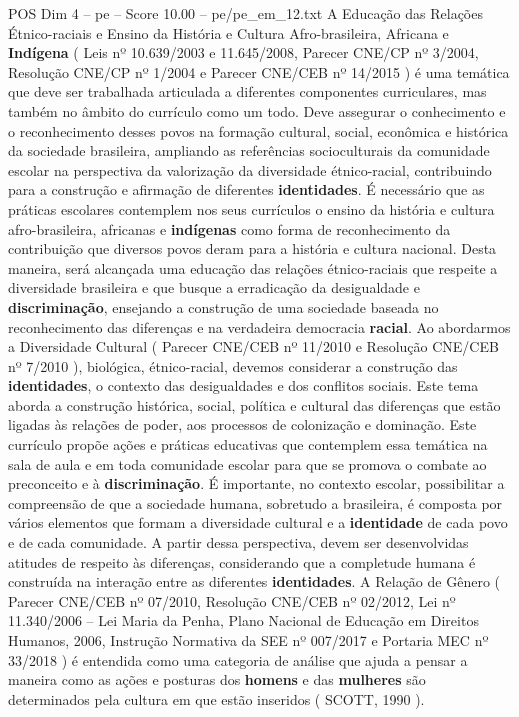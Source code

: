\begin{textsample}{POS Dim 4 – pe – Score 10.00 – pe/pe\_em\_12.txt}
A Educação das Relações Étnico-raciais e Ensino da História e Cultura Afro-brasileira, Africana e \textbf{Indígena} ( Leis nº 10.639/2003 e 11.645/2008, Parecer CNE/CP nº 3/2004, Resolução CNE/CP nº 1/2004 e Parecer CNE/CEB nº 14/2015 ) é uma temática que deve ser trabalhada articulada a diferentes componentes curriculares, mas também no âmbito do currículo como um todo.
Deve assegurar o conhecimento e o reconhecimento desses povos na formação cultural, social, econômica e histórica da sociedade brasileira, ampliando as referências socioculturais da comunidade escolar na perspectiva da valorização da diversidade étnico-racial, contribuindo para a construção e afirmação de diferentes \textbf{identidades}.
É necessário que as práticas escolares contemplem nos seus currículos o ensino da história e cultura afro-brasileira, africanas e \textbf{indígenas} como forma de reconhecimento da contribuição que diversos povos deram para a história e cultura nacional.
Desta maneira, será alcançada uma educação das relações étnico-raciais que respeite a diversidade brasileira e que busque a erradicação da desigualdade e \textbf{discriminação}, ensejando a construção de uma sociedade baseada no reconhecimento das diferenças e na verdadeira democracia \textbf{racial}.
Ao abordarmos a Diversidade Cultural ( Parecer CNE/CEB nº 11/2010 e Resolução CNE/CEB nº 7/2010 ), biológica, étnico-racial, devemos considerar a construção das \textbf{identidades}, o contexto das desigualdades e dos conflitos sociais.
Este tema aborda a construção histórica, social, política e cultural das diferenças que estão ligadas às relações de poder, aos processos de colonização e dominação.
Este currículo propõe ações e práticas educativas que contemplem essa temática na sala de aula e em toda comunidade escolar para que se promova o combate ao preconceito e à \textbf{discriminação}.
É importante, no contexto escolar, possibilitar a compreensão de que a sociedade humana, sobretudo a brasileira, é composta por vários elementos que formam a diversidade cultural e a \textbf{identidade} de cada povo e de cada comunidade.
A partir dessa perspectiva, devem ser desenvolvidas atitudes de respeito às diferenças, considerando que a completude humana é construída na interação entre as diferentes \textbf{identidades}.
A Relação de Gênero ( Parecer CNE/CEB nº 07/2010, Resolução CNE/CEB nº 02/2012, Lei nº 11.340/2006 – Lei Maria da Penha, Plano Nacional de Educação em Direitos Humanos, 2006, Instrução Normativa da SEE nº 007/2017 e Portaria MEC nº 33/2018 ) é entendida como uma categoria de análise que ajuda a pensar a maneira como as ações e posturas dos \textbf{homens} e das \textbf{mulheres} são determinados pela cultura em que estão inseridos ( SCOTT, 1990 ).

\end{textsample}
